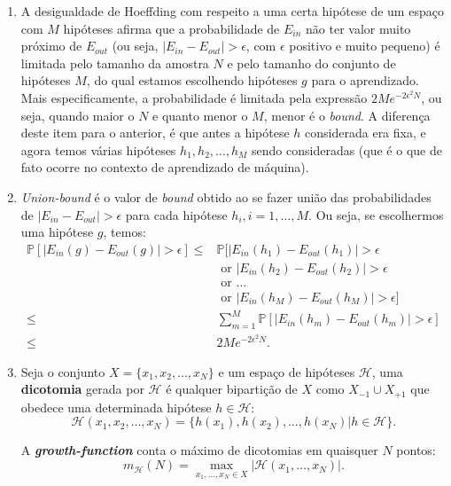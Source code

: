 \documentclass[a4paper,11pt]{article}
\begin{document}
\begin{enumerate}
        \item A desigualdade de Hoeffding com respeito a uma certa hipótese de um espaço com $M$ hipóteses afirma que a probabilidade de $E_{in}$ não ter valor muito próximo de $E_{out}$ (ou seja, $| E_{in} - E_{out} | > \epsilon$, com $\epsilon$ positivo e muito pequeno) é limitada pelo tamanho da amostra $N$ e pelo tamanho do conjunto de hipóteses $M$, do qual estamos escolhendo hipóteses $g$ para o aprendizado. Mais especificamente, a probabilidade é limitada pela expressão $2Me^{-2 \epsilon^2N}$, ou seja, quando maior o $N$ e quanto menor o $M$, menor é o \textit{bound}. A diferença deste item para o anterior, é que antes a hipótese $h$ considerada era fixa, e agora temos várias hipóteses $h_1, h_2, \dots, h_M$ sendo consideradas (que é o que de fato ocorre no contexto de aprendizado de máquina).
        
        \item \textit{Union-bound} é o valor de \textit{bound} obtido ao se fazer união das probabilidades de $| E_{in} - E_{out} | > \epsilon$ para cada hipótese $h_i, i = 1, \dots, M$. Ou seja, se escolhermos uma hipótese $g$, temos:
        \[
            \begin{array}{rl}
                \mathbb{P}[|E_{in}(g) - E_{out}(g)|> \epsilon] \leq & \mathbb{P}[|E_{in}(h_1) - E_{out}(h_1)|> \epsilon \\
                & \text{ or }  |E_{in}(h_2) - E_{out}(h_2)|> \epsilon \\
                & \text{ or } \dots \\
                & \text{ or } |E_{in}(h_M) - E_{out}(h_M)|> \epsilon]  \\
                \leq & \sum^M_{m=1} \mathbb{P}[|E_{in}(h_m) - E_{out}(h_m)|> \epsilon] \\
                \leq & 2Me^{-2 \epsilon^2 N}.
            \end{array}
        \]
        
        \item Seja o conjunto $X = \{ x_1, x_2, \dots, x_N \}$ e um espaço de hipóteses $\mathcal{H}$, uma \textbf{dicotomia} gerada por $\mathcal{H}$ é qualquer bipartição de $X$ como $X_{-1} \cup X_{+1}$ que obedece uma determinada hipótese $h \in \mathcal{H}$:
        \[
            \mathcal{H}(x_1, x_2, \dots, x_N) = \{ h(x_1), h(x_2), \dots, h(x_N) | h \in \mathcal{H} \}.
        \]

        A \textbf{\textit{growth-function}} conta o máximo de dicotomias em quaisquer $N$ pontos:
        \[
            m_{\mathcal{H}}(N) = \max_{x_1, \dots, x_N \in X} |\mathcal{H} (x_1, \dots, x_N)|.
        \]
        

\end{enumerate}
\end{document}
